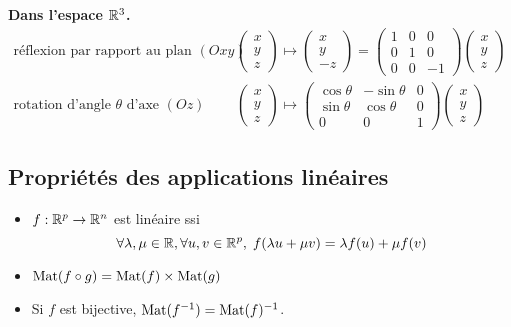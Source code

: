 \documentclass[10pt,class=article,crop=false]{standalone}
\begin{document}
\begin{multicols}{2}
\textbf{Dans l'espace  \(\mathbb{R}^3\).}
\[
\begin{array}{ll}
\text{réflexion par rapport au plan $(Oxy)$} &
\begin{pmatrix} x \\ y \\ z \end{pmatrix} \mapsto \begin{pmatrix} x \\ y \\ -z \end{pmatrix}
= \begin{pmatrix} 1 & 0 & 0 \\ 0 & 1 & 0 \\ 0 & 0 & -1 \end{pmatrix} \begin{pmatrix} x \\ y \\ z \end{pmatrix}
\\[3em]
\text{rotation d'angle \(\theta\) d'axe $(Oz)$} &
\begin{pmatrix} x \\ y \\ z \end{pmatrix} \mapsto 
\begin{pmatrix} \cos \theta & -\sin \theta & 0 \\ \sin \theta & \cos \theta & 0 \\ 0 & 0 & 1 \end{pmatrix} \begin{pmatrix} x \\ y \\ z \end{pmatrix}
\end{array}
\]


\subsection{Propriétés des applications linéaires}

\begin{itemize}
	\item $f : \mathbb{R}^p \to \mathbb{R}^n$ est linéaire ssi 
\[\forall \lambda,\mu \in \mathbb{R}, \forall u,v \in \mathbb{R}^p, \; 
f(\lambda u + \mu v) = \lambda f(u) + \mu f(v)
\]

  \item $\operatorname{Mat}(f \circ g) = \operatorname{Mat}(f) \times \operatorname{Mat}(g)$
  
  \item Si \(f\) est bijective, $\operatorname{Mat}(f^{-1}) = \operatorname{Mat}(f)^{-1}$.
  
\end{itemize}


\end{multicols}
\end{document}

